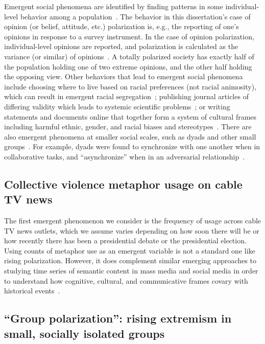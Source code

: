 \documentclass[12pt,letterpaper]{article}
\begin{document}
Emergent social phenomena are identified by finding patterns in some 
individual-level behavior among a population~\cite{Blau1974,Schelling2006}.
The behavior in this dissertation's case of opinion (or belief, attitude, etc.) 
polarization is, e.g., the reporting of one's opinions in response to a survey
instrument. 
In the case of opinion polarization, 
individual-level opinions are reported, and polarization is calculated 
as the variance (or similar) of opinions~\cite{Bramson2016}. A totally polarized society has
exactly half of the population holding one of two extreme opinions, and the
other half holding the opposing view. 
Other behaviors that lead to emergent social phenomena 
include choosing where to live based on racial preferences (not racial animosity), 
which can result in emergent racial segregation~\cite{Schelling1971}; publishing journal 
articles of differing validity which leads to systemic scientific problems~\cite{Smaldino2019};
or writing statements and documents online that together form a system of 
cultural frames including harmful ethnic, gender, and racial biases and 
stereotypes~\cite{Caliskan2017,Garg2018}. There are also emergent phenomena
at smaller social scales, such as dyads and other small groups~\cite{Abney2014a}. 
For example, dyads were found to synchronize with one another when in collaborative
tasks, and ``asynchronize'' when in an adversarial 
relationship~\cite{Abney2014,Ramirez-Aristizabal2018,Schloesser2019,Schneider2020,Abney2021}.

\subsection{Collective violence metaphor usage on cable TV news}

The first emergent phenomenon we consider is the frequency of usage across
cable TV news outlets, which we assume varies depending on how soon there will
be or how recently there has been a presidential debate or the presidential 
election. Using counts of metaphor use as an emergent variable 
is not a standard one like rising polarization. However, it does 
complement similar emerging approaches to studying time series of semantic content in
mass media and social media in order to understand how cognitive, cultural, and
communicative frames covary with historical 
events~\cite{Nunn2012,Klingenstein2014,Hamilton2016c,Caliskan2017,Barron2018,Garg2018}. 


\subsection{``Group polarization'': rising extremism in small, socially isolated groups}
\end{document}
